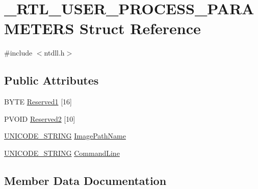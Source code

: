 \section{\-\_\-\-R\-T\-L\-\_\-\-U\-S\-E\-R\-\_\-\-P\-R\-O\-C\-E\-S\-S\-\_\-\-P\-A\-R\-A\-M\-E\-T\-E\-R\-S Struct Reference}
\label{struct___r_t_l___u_s_e_r___p_r_o_c_e_s_s___p_a_r_a_m_e_t_e_r_s}


{\ttfamily \#include $<$ntdll.\-h$>$}

\subsection*{Public Attributes}
\begin{DoxyCompactItemize}
\item 
B\-Y\-T\-E \hyperlink{struct___r_t_l___u_s_e_r___p_r_o_c_e_s_s___p_a_r_a_m_e_t_e_r_s_ae8f435b442e2bb0bca999c8c000459b6}{Reserved1} \mbox{[}16\mbox{]}
\item 
P\-V\-O\-I\-D \hyperlink{struct___r_t_l___u_s_e_r___p_r_o_c_e_s_s___p_a_r_a_m_e_t_e_r_s_aba13eeeda80da28a80db8cc956c05ac0}{Reserved2} \mbox{[}10\mbox{]}
\item 
\hyperlink{ntdll_8h_afb1771465aaa5d77efedcfc1a3a43dfb}{U\-N\-I\-C\-O\-D\-E\-\_\-\-S\-T\-R\-I\-N\-G} \hyperlink{struct___r_t_l___u_s_e_r___p_r_o_c_e_s_s___p_a_r_a_m_e_t_e_r_s_a8c997ab334377bd6701d620ca23a44d6}{Image\-Path\-Name}
\item 
\hyperlink{ntdll_8h_afb1771465aaa5d77efedcfc1a3a43dfb}{U\-N\-I\-C\-O\-D\-E\-\_\-\-S\-T\-R\-I\-N\-G} \hyperlink{struct___r_t_l___u_s_e_r___p_r_o_c_e_s_s___p_a_r_a_m_e_t_e_r_s_a21089d210015015eae974a58bff5efee}{Command\-Line}
\end{DoxyCompactItemize}


\subsection{Member Data Documentation}
